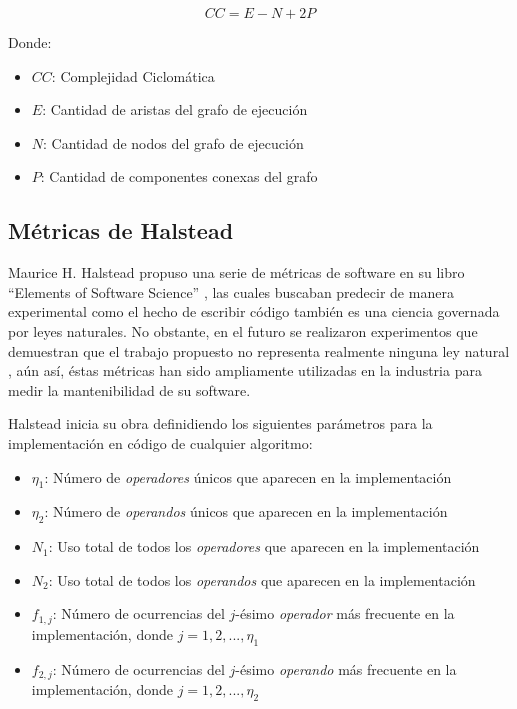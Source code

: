 \documentclass[letterpaper,12pt]{article}
\begin{document}
\begin{equation}
  CC = E - N + 2P
\end{equation}

Donde:

\begin{itemize}
  \item $CC$: Complejidad Ciclomática
  \item $E$: Cantidad de aristas del grafo de ejecución
  \item $N$: Cantidad de nodos del grafo de ejecución
  \item $P$: Cantidad de componentes conexas del grafo
\end{itemize}

\subsection{Métricas de Halstead}

Maurice H. Halstead propuso una serie de métricas de software en su libro ``Elements of Software Science'' \cite{10.5555/540137}, las cuales buscaban predecir de manera experimental como el hecho de escribir código también es una ciencia governada por leyes naturales. No obstante, en el futuro se realizaron experimentos que demuestran que el trabajo propuesto no representa realmente ninguna ley natural \cite{10.5555/800254.807762}, aún así, éstas métricas han sido ampliamente utilizadas en la industria para medir la mantenibilidad de su software.

Halstead inicia su obra definidiendo los siguientes parámetros para la implementación en código de cualquier algoritmo:

\begin{itemize}
  \item $\eta_{1}$: Número de \textit{operadores} únicos que aparecen en la implementación
  \item $\eta_{2}$: Número de \textit{operandos} únicos que aparecen en la implementación
  \item $N_{1}$: Uso total de todos los \textit{operadores} que aparecen en la implementación
  \item $N_{2}$: Uso total de todos los \textit{operandos} que aparecen en la implementación
  \item $f_{1,j}$: Número de ocurrencias del $j$-ésimo \textit{operador} más frecuente en la implementación, donde $j = 1, 2, ..., \eta_{1}$
  \item $f_{2,j}$: Número de ocurrencias del $j$-ésimo \textit{operando} más frecuente en la implementación, donde $j = 1, 2, ..., \eta_{2}$
\end{itemize}
\end{document}
